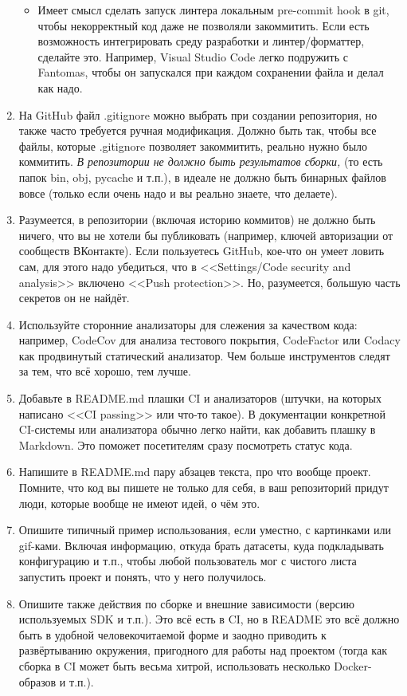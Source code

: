 \documentclass[a5paper]{article}
\begin{document}
\begin{enumerate}
\begin{itemize}
        \item Имеет смысл сделать запуск линтера локальным pre-commit hook в git, чтобы некорректный код даже не позволяли закоммитить. Если есть возможность интегрировать среду разработки и линтер/форматтер, сделайте это. Например, Visual Studio Code легко подружить с Fantomas, чтобы он запускался при каждом сохранении файла и делал как надо.
    \end{itemize}
    \item На GitHub файл .gitignore можно выбрать при создании репозитория, но также часто требуется ручная модификация. Должно быть так, чтобы все файлы, которые .gitignore позволяет закоммитить, реально нужно было коммитить. \emph{В репозитории не должно быть результатов сборки,} (то есть папок bin, obj, pycache и т.п.), в идеале не должно быть бинарных файлов вовсе (только если очень надо и вы реально знаете, что делаете).
    \item Разумеется, в репозитории (включая историю коммитов) не должно быть ничего, что вы не хотели бы публиковать (например, ключей авторизации от сообществ ВКонтакте). Если пользуетесь GitHub, кое-что он умеет ловить сам, для этого надо убедиться, что в <<Settings/Code security and analysis>> включено <<Push protection>>. Но, разумеется, большую часть секретов он не найдёт.
    \item Используйте сторонние анализаторы для слежения за качеством кода: например, CodeCov для анализа тестового покрытия, CodeFactor или Codacy как продвинутый статический анализатор. Чем больше инструментов следят за тем, что всё хорошо, тем лучше.
    \item Добавьте в README.md плашки CI и анализаторов (штучки, на которых написано <<CI passing>> или что-то такое). В документации конкретной CI-системы или анализатора обычно легко найти, как добавить плашку в Markdown. Это поможет посетителям сразу посмотреть статус кода.
    \item Напишите в README.md пару абзацев текста, про что вообще проект. Помните, что код вы пишете не только для себя, в ваш репозиторий придут люди, которые вообще не имеют идей, о чём это.
    \item Опишите типичный пример использования, если уместно, с картинками или gif-ками. Включая информацию, откуда брать датасеты, куда подкладывать конфигурацию и т.п., чтобы любой пользователь мог с чистого листа запустить проект и понять, что у него получилось.
    \item Опишите также действия по сборке и внешние зависимости (версию используемых SDK и т.п.). Это всё есть в CI, но в README это всё должно быть в удобной человекочитаемой форме и заодно приводить к развёртыванию окружения, пригодного для работы над проектом (тогда как сборка в CI может быть весьма хитрой, использовать несколько Docker-образов и т.п.).

\end{enumerate}
\end{document}
